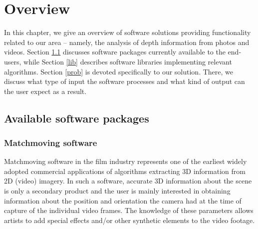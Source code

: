 \chapter{Overview}
\label{chap:overview} 

In this chapter, we give an overview of software solutions providing functionality related to our area -- namely, the analysis of depth information from photos and videos. 
Section \ref{soft} discusses software packages currently available to the end-users, while Section \ref{lib} describes software libraries implementing relevant algorithms. 
Section \ref{prob} is devoted specifically to our solution. 
There, we discuss what type of input the software processes and what kind of output can the user expect as a result. 

\section{Available software packages}
\label{soft} 


\subsection{Matchmoving software} 

Matchmoving software in the film industry represents one of the earliest widely adopted commercial applications of algorithms extracting 3D information from 2D (video) imagery.
In such a software, accurate 3D information about the scene is only a secondary product and the user is mainly interested in obtaining information about the position and orientation the camera had at the time of capture of the individual video frames.
The knowledge of these parameters allows artists to add special effects and/or other synthetic elements to the video footage. 

